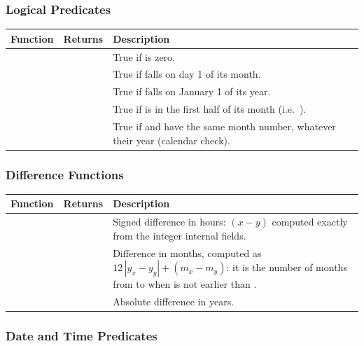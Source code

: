\subsubsection{Logical Predicates}

\begin{longtable}{L{4.5cm} L{4cm} L{5.5cm}}
  \toprule
  \textbf{Function} & \textbf{Returns} & \textbf{Description} \\
  \midrule
  \endhead
  \bottomrule
  \endfoot
      &  &
    True if  is zero. \\
      &  &
    True if  falls on day 1 of its month. \\
       &  &
    True if  falls on January 1 of its year. \\
      &  &
    True if  is in the first half of its month
    (i.e.\ ). \\
   &  &
    True if  and  have the same month number, whatever
    their year (calendar check). \\
\end{longtable}

\subsubsection{Difference Functions}

\begin{longtable}{L{4.5cm} L{4cm} L{5.5cm}}
  \toprule
  \textbf{Function} & \textbf{Returns} & \textbf{Description} \\
  \midrule
  \endhead
  \bottomrule
  \endfoot
    &  &
    Signed difference in hours: $(x - y)$ computed exactly from the integer
    internal fields. \\
    &  &
    Difference in months, computed as
    $12\,|y_x - y_y| + (m_x - m_y)$: it is the number of months from
     to  when  is not earlier than . \\
   &  &
    Absolute difference in years. \\
\end{longtable}

\subsubsection{Date and Time Predicates}


